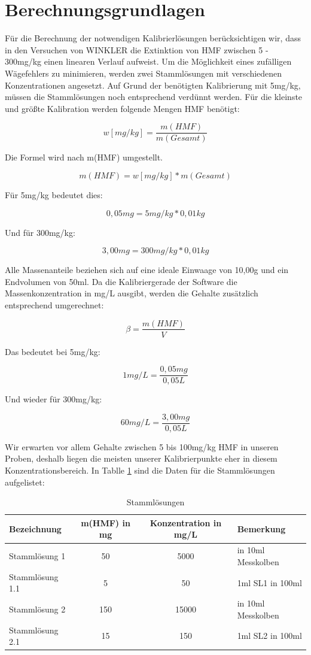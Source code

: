 \section{Berechnungsgrundlagen}
Für die Berechnung der notwendigen Kalibrierlösungen berücksichtigen wir, dass in den Versuchen von WINKLER die Extinktion von HMF zwischen 5 - 300mg/kg einen linearen Verlauf aufweist. Um die Möglichkeit eines zufälligen Wägefehlers zu minimieren, werden zwei Stammlösungen mit verschiedenen Konzentrationen angesetzt. Auf Grund der benötigten Kalibrierung mit 5mg/kg, müssen die Stammlösungen noch entsprechend verdünnt werden. Für die kleinste und größte Kalibration werden folgende Mengen HMF benötigt:

	\[w[mg/kg]=\frac{ m(HMF) }{ m(Gesamt) }\]
	
Die Formel wird nach m(HMF) umgestellt.

	\[m(HMF)=w[mg/kg]*m(Gesamt)\]
	
Für 5mg/kg bedeutet dies:
	
	\[0,05mg=5mg/kg*0,01kg\]
	
Und für 300mg/kg:

	\[3,00mg=300mg/kg*0,01kg\]
	
Alle Massenanteile beziehen sich auf eine ideale Einwaage von 10,00g und ein Endvolumen von 50ml.
Da die Kalibriergerade der Software die Massenkonzentration in mg/L ausgibt, werden die Gehalte zusätzlich entsprechend umgerechnet:

\[\beta=\frac{ m(HMF) }{ V }\]

Das bedeutet bei 5mg/kg:

\[1mg/L=\frac{ 0,05mg }{ 0,05L }\]

Und wieder für 300mg/kg:

\[60mg/L=\frac{ 3,00mg }{ 0,05L }\]

Wir erwarten vor allem Gehalte zwischen 5 bis 100mg/kg HMF in unseren Proben, deshalb liegen die meisten unserer Kalibrierpunkte eher in diesem Konzentrationsbereich.
In Tablle \ref{tab:Stammlösungen} sind die Daten für die Stammlösungen aufgelistet:

\begin{table}[htbp]
	\centering
	\caption{Stammlösungen}
		\begin{tabular}{l|c|c|l}
			Bezeichnung & m(HMF) in mg & Konzentration in mg/L & Bemerkung\\
			\hline
			Stammlösung 1 & 50 & 5000  & in 10ml Messkolben\\
			\hline
			Stammlösung 1.1 & 5 & 50 & 1ml SL1 in 100ml\\
			\hline
			Stammlösung 2 & 150 & 15000 & in 10ml Messkolben\\
			\hline
			Stammlösung 2.1 & 15 & 150 & 1ml SL2 in 100ml\\
		\end{tabular}
		\label{tab:Stammlösungen}
\end{table}

